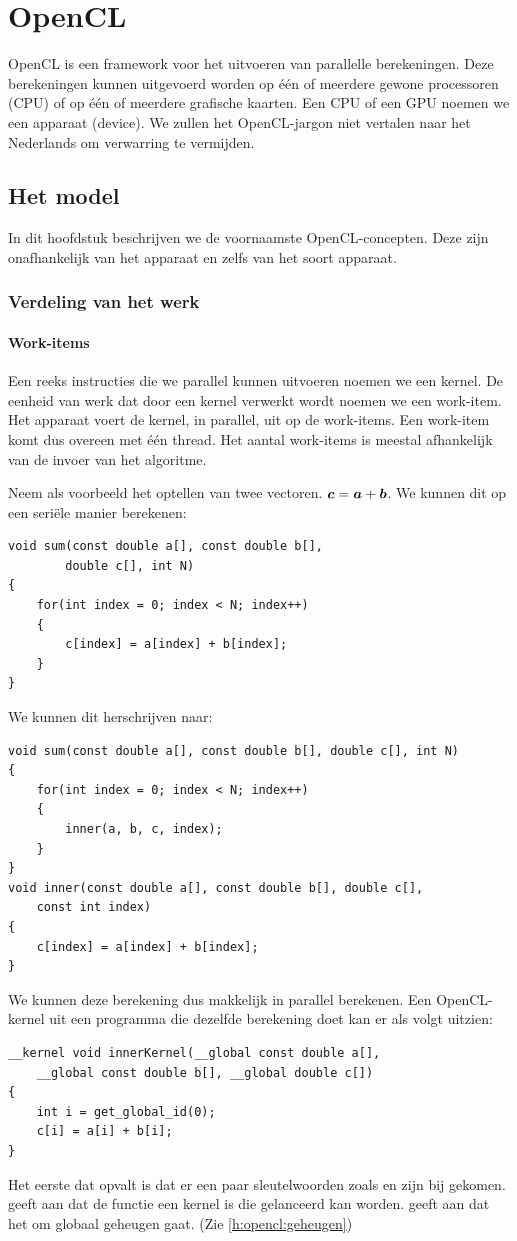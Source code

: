 \chapter{OpenCL}
\label{h:opencl} 
OpenCL is een framework voor het uitvoeren van parallelle berekeningen. Deze berekeningen kunnen uitgevoerd worden op \'e\'en of meerdere gewone processoren (CPU) of op \'e\'en of meerdere grafische kaarten. Een CPU of een GPU noemen we een apparaat (device). We zullen het OpenCL-jargon niet vertalen naar het Nederlands om verwarring te vermijden.

\section{Het model}
In dit hoofdstuk beschrijven we de voornaamste OpenCL-concepten. Deze zijn onafhankelijk van het apparaat en zelfs van het soort apparaat.
\subsection{Verdeling van het werk}
\subsubsection{Work-items}
Een reeks instructies die we parallel kunnen uitvoeren noemen we een kernel. De eenheid van werk dat door een kernel verwerkt wordt noemen we een work-item. Het apparaat voert de kernel, in parallel, uit op de work-items. Een work-item komt dus overeen met \'e\'en thread. Het aantal work-items is meestal afhankelijk van de invoer van het algoritme.

Neem als voorbeeld het optellen van twee vectoren. $\boldsymbol{c} = \boldsymbol{a} + \boldsymbol{b}$. We kunnen dit op een seri\"ele manier berekenen:

\begin{lstlisting}
void sum(const double a[], const double b[],
        double c[], int N)
{
    for(int index = 0; index < N; index++)
    {
        c[index] = a[index] + b[index];
    }
}
\end{lstlisting}
We kunnen dit herschrijven naar:
\begin{lstlisting}
void sum(const double a[], const double b[], double c[], int N)
{
    for(int index = 0; index < N; index++)
    {
        inner(a, b, c, index);
    }
}
void inner(const double a[], const double b[], double c[],
    const int index)
{
    c[index] = a[index] + b[index];
}
\end{lstlisting}
We kunnen deze berekening dus makkelijk in parallel berekenen.
Een OpenCL-kernel uit een programma die dezelfde berekening doet kan er als volgt uitzien:
\begin{lstlisting}
__kernel void innerKernel(__global const double a[],
    __global const double b[], __global double c[])
{
    int i = get_global_id(0);
    c[i] = a[i] + b[i];
}
\end{lstlisting}
Het eerste dat opvalt is dat er een paar sleutelwoorden zoals  en  zijn bij gekomen.  geeft aan dat de functie een kernel is die gelanceerd kan worden.  geeft aan dat het om globaal geheugen gaat. (Zie \ref{h:opencl:geheugen})

